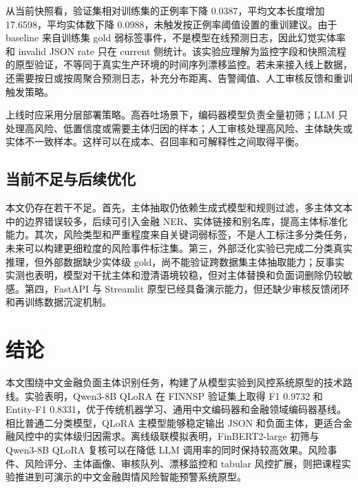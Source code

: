 \documentclass[UTF8,a4paper,12pt]{ctexart}
\begin{document}
从当前快照看，验证集相对训练集的正例率下降 0.0387，平均文本长度增加 17.6598，平均实体数下降 0.0988，未触发按正例率阈值设置的重训建议。由于 baseline 来自训练集 gold 弱标签事件，不是模型在线预测日志，因此幻觉实体率和 invalid JSON rate 只在 current 侧统计。该实验应理解为监控字段和快照流程的原型验证，不等同于真实生产环境的时间序列漂移监控。若未来接入线上数据，还需要按日或按周聚合预测日志，补充分布距离、告警阈值、人工审核反馈和重训触发策略。

上线时应采用分层部署策略。高吞吐场景下，编码器模型负责全量初筛；LLM 只处理高风险、低置信度或需要主体归因的样本；人工审核处理高风险、主体缺失或实体不一致样本。这样可以在成本、召回率和可解释性之间取得平衡。

\subsection{当前不足与后续优化}

本文仍存在若干不足。首先，主体抽取仍依赖生成式模型和规则过滤，多主体文本中的边界错误较多，后续可引入金融 NER、实体链接和别名库，提高主体标准化能力。其次，风险类型和严重程度来自关键词弱标签，不是人工标注多分类任务，未来可以构建更细粒度的风险事件标注集。第三，外部泛化实验已完成二分类真实推理，但外部数据缺少实体级 gold，尚不能验证跨数据集主体抽取能力；反事实实测也表明，模型对干扰主体和澄清语境较稳，但对主体替换和负面词删除仍较敏感。第四，FastAPI 与 Streamlit 原型已经具备演示能力，但还缺少审核反馈闭环和再训练数据沉淀机制。

\section{结论}

本文围绕中文金融负面主体识别任务，构建了从模型实验到风控系统原型的技术路线。实验表明，Qwen3-8B QLoRA 在 FINNSP 验证集上取得 F1 0.9732 和 Entity-F1 0.8331，优于传统机器学习、通用中文编码器和金融领域编码器基线。相比普通二分类模型，QLoRA 主模型能够稳定输出 JSON 和负面主体，更适合金融风控中的实体级归因需求。离线级联模拟表明，FinBERT2-large 初筛与 Qwen3-8B QLoRA 复核可以在降低 LLM 调用率的同时保持较高效果。风险事件、风险评分、主体画像、审核队列、漂移监控和 tabular 风控扩展，则把课程实验推进到可演示的中文金融舆情风险智能预警系统原型。
\end{document}
